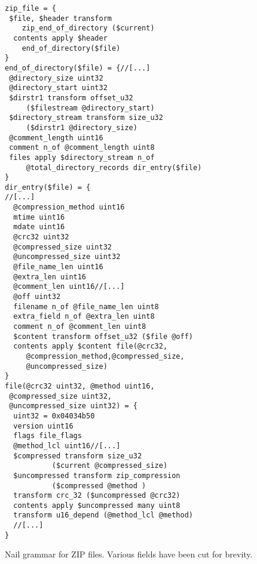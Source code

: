 \begin{figure}
\begin{verbatim}
zip_file = { 
 $file, $header transform 
    zip_end_of_directory ($current)
  contents apply $header
    end_of_directory($file)
}
end_of_directory($file) = {//[...]
 @directory_size uint32 
 @directory_start uint32
 $dirstr1 transform offset_u32 
     ($filestream @directory_start) 
 $directory_stream transform size_u32 
     ($dirstr1 @directory_size)
 @comment_length uint16
 comment n_of @comment_length uint8
 files apply $directory_stream n_of 
     @total_directory_records dir_entry($file)
}
dir_entry($file) = {
//[...]  
  @compression_method uint16      
  mtime uint16
  mdate uint16
  @crc32 uint32
  @compressed_size uint32
  @uncompressed_size uint32
  @file_name_len uint16
  @extra_len uint16
  @comment_len uint16//[...]
  @off uint32
  filename n_of @file_name_len uint8
  extra_field n_of @extra_len uint8
  comment n_of @comment_len uint8
  $content transform offset_u32 ($file @off)
  contents apply $content file(@crc32,
     @compression_method,@compressed_size, 
     @uncompressed_size)
}
file(@crc32 uint32, @method uint16,
 @compressed_size uint32, 
 @uncompressed_size uint32) = { 
  uint32 = 0x04034b50
  version uint16
  flags file_flags
  @method_lcl uint16//[...]
  $compressed transform size_u32 
           ($current @compressed_size)
  $uncompressed transform zip_compression 
           ($compressed @method )
  transform crc_32 ($uncompressed @crc32)
  contents apply $uncompressed many uint8
  transform u16_depend (@method_lcl @method)
  //[...]
}
\end{verbatim}
\caption{Nail grammar for ZIP files. Various fields have been cut for brevity.}
\label{fig:zip-extract}
\end{figure}
